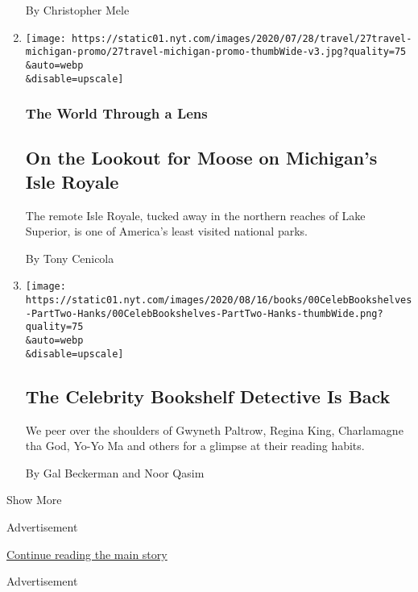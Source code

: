 \begin{enumerate}
  By Christopher Mele
\item
  \href{/2020/07/27/travel/moose-michigan-isle-royale.html}{}

  \texttt{[image: https://static01.nyt.com/images/2020/07/28/travel/27travel-michigan-promo/27travel-michigan-promo-thumbWide-v3.jpg?quality=75\\\&auto=webp\\\&disable=upscale]}

  \hypertarget{the-world-through-a-lens}{%
  \subsubsection{The World Through a
  Lens}\label{the-world-through-a-lens}}

  \hypertarget{on-the-lookout-for-moose-on-michigans-isle-royale}{%
  \subsection{On the Lookout for Moose on Michigan's Isle
  Royale}\label{on-the-lookout-for-moose-on-michigans-isle-royale}}

  The remote Isle Royale, tucked away in the northern reaches of Lake
  Superior, is one of America's least visited national parks.

  By Tony Cenicola
\item
  \href{/2020/07/27/books/tom-hanks-gwyneth-paltrow-bookshelves.html}{}

  \texttt{[image: https://static01.nyt.com/images/2020/08/16/books/00CelebBookshelves-PartTwo-Hanks/00CelebBookshelves-PartTwo-Hanks-thumbWide.png?quality=75\\\&auto=webp\\\&disable=upscale]}

  \hypertarget{the-celebrity-bookshelf-detective-is-back}{%
  \subsection{The Celebrity Bookshelf Detective Is
  Back}\label{the-celebrity-bookshelf-detective-is-back}}

  We peer over the shoulders of Gwyneth Paltrow, Regina King,
  Charlamagne tha God, Yo-Yo Ma and others for a glimpse at their
  reading habits.

  By Gal Beckerman and Noor Qasim
\end{enumerate}

Show More

Advertisement

\protect\hyperlink{after-mid2}{Continue reading the main story}

Advertisement

